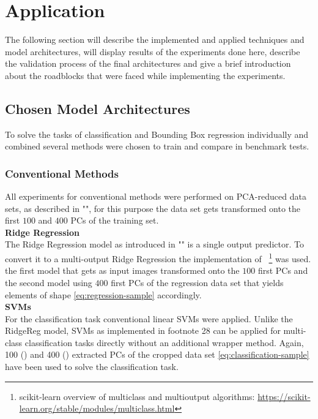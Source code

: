 \section{Application}\label{sec:application}
The following section will describe the implemented and applied techniques and model architectures, will display results of the experiments done here, describe the validation process of the final architectures and give a brief introduction about the roadblocks that were faced while implementing the experiments.

\subsection{Chosen Model Architectures}\label{subsec:model-architectures}
To solve the tasks of classification and Bounding Box regression individually and combined several methods were chosen to train and compare in benchmark tests.
\subsubsection{Conventional Methods}
All experiments for conventional methods were performed on PCA-reduced data sets, as described in "", for this purpose the data set gets transformed onto the first $100$ and $400$ PCs of the training set.\\
\textbf{Ridge Regression}\\
The Ridge Regression model as introduced in "" is a single output predictor.
To convert it to a multi-output Ridge Regression the implementation of ~\footnote{scikit-learn overview of multiclass and multioutput algorithms: \url{https://scikit-learn.org/stable/modules/multiclass.html}} was used.
 the first model that gets as input images transformed onto the $100$ first PCs and  the second model using $400$ first PCs of the regression data set that yields elements of shape \eqref{eq:regression-sample} accordingly.\\
\textbf{SVMs}\\
For the classification task conventional linear SVMs were applied.
Unlike the RidgeReg model, SVMs as implemented in footnote 28 can be applied for multi-class classification tasks directly without an additional wrapper method.
Again, 100 () and 400 () extracted PCs of the cropped data set \eqref{eq:classification-sample} have been used to solve the classification task.
